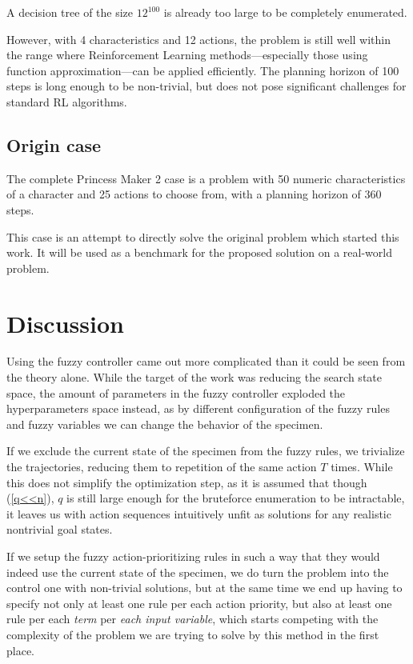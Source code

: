 \documentclass[11pt, a4paper]{article}
\begin{document}
	A decision tree of the size $12^{100}$ is already too large to be completely enumerated.

	However, with 4 characteristics and 12 actions, the problem is still well within the range where Reinforcement Learning methods—especially those using function approximation—can be applied efficiently.
	The planning horizon of 100 steps is long enough to be non-trivial, but does not pose significant challenges for standard RL algorithms.

	\subsection{Origin case}

	The complete Princess Maker 2 case is a problem with 50 numeric characteristics of a character and 25 actions to choose from, with a planning horizon of 360 steps.

	This case is an attempt to directly solve the original problem which started this work.
	It will be used as a benchmark for the proposed solution on a real-world problem.

	\section{Discussion}

	Using the fuzzy controller came out more complicated than it could be seen from the theory alone.
	While the target of the work was reducing the search state space, the amount of parameters in the fuzzy controller exploded the hyperparameters space instead, as by different configuration of the fuzzy rules and fuzzy variables we can change the behavior of the specimen.
	
	If we exclude the current state of the specimen from the fuzzy rules, we trivialize the trajectories, reducing them to repetition of the same action $T$ times.
	While this does not simplify the optimization step, as it is assumed that though (\ref{q<<n}), $q$ is still large enough for the bruteforce enumeration to be intractable, it leaves us with action sequences intuitively unfit as solutions for any realistic nontrivial goal states.

	If we setup the fuzzy action-prioritizing rules in such a way that they would indeed use the current state of the specimen, we do turn the problem into the control one with non-trivial solutions, but at the same time we end up having to specify not only at least one rule per each action priority, but also at least one rule per each \textit{term} per \textit{each input variable}, which starts competing with the complexity of the problem we are trying to solve by this method in the first place.
	
\end{document}
